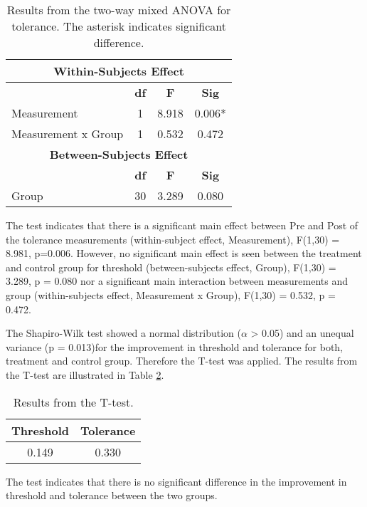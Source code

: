 \begin{table}[ht]
\caption{Results from the two-way mixed ANOVA for tolerance. The asterisk indicates significant difference.}
\centering
\begin{tabular}{l c c c}
\toprule
\multicolumn{4}{c}{\textbf{Within-Subjects Effect}} \\
\midrule  
& \textbf{df} & \textbf{F} & \textbf{Sig} \\ [0.5ex] %
Measurement & 1 &  8.918 &  0.006* \\
Measurement x Group & 1 & 0.532 & 0.472 \\
\toprule
\multicolumn{4}{c}{\textbf{Between-Subjects Effect}} \\
\midrule
 & \textbf{df} & \textbf{F} & \textbf{Sig} \\ [0.5ex] %
Group & 30 & 3.289 &  0.080 \\
\hline
\end{tabular}
\label{table:TWOWAYANOVA2}
\end{table}

\noindent
The test indicates that there is a significant main effect between Pre and Post of the tolerance measurements (within-subject effect, Measurement), F(1,30) = 8.981, p=0.006. However, no significant main effect is seen between the treatment and control group for threshold (between-subjects effect, Group), F(1,30) = 3.289, p = 0.080 nor a significant main interaction between  measurements and group (within-subjects effect, Measurement x Group), F(1,30) = 0.532, p = 0.472.

The Shapiro-Wilk test showed a normal distribution ($\alpha$ > 0.05) and an unequal variance (p = 0.013)for the improvement in threshold and tolerance for both, treatment and control group. Therefore the T-test was applied. The results from the T-test are illustrated in Table \ref{table:TTEST}. 

\begin{table}[ht]
\caption{Results from the T-test.}
\centering
\begin{tabular}{c c}
\toprule
\textbf{Threshold} & \textbf{Tolerance} \\
\midrule
 0.149 &  0.330 \\
\hline
\end{tabular}
\label{table:TTEST}
\end{table}

\noindent
The test indicates that there is no significant difference in the improvement in threshold and tolerance between the two groups.